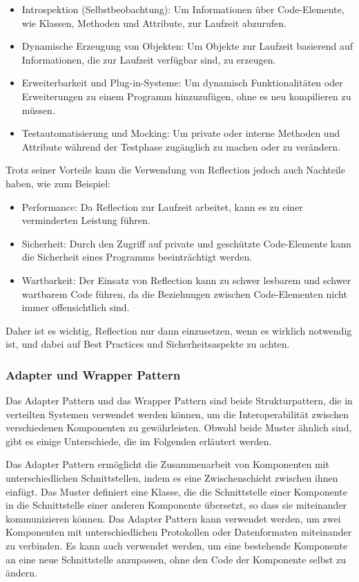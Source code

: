 \begin{itemize}
\item Introspektion (Selbstbeobachtung): Um Informationen über Code-Elemente, wie Klassen, Methoden und Attribute, zur Laufzeit abzurufen.
\item Dynamische Erzeugung von Objekten: Um Objekte zur Laufzeit basierend auf Informationen, die zur Laufzeit verfügbar sind, zu erzeugen.
\item Erweiterbarkeit und Plug-in-Systeme: Um dynamisch Funktionalitäten oder Erweiterungen zu einem Programm hinzuzufügen, ohne es neu kompilieren zu müssen.
\item Testautomatisierung und Mocking: Um private oder interne Methoden und Attribute während der Testphase zugänglich zu machen oder zu verändern.
\end{itemize}    
Trotz seiner Vorteile kann die Verwendung von Reflection jedoch auch Nachteile haben, wie zum Beispiel:
\begin{itemize}
\item Performance: Da Reflection zur Laufzeit arbeitet, kann es zu einer verminderten Leistung führen.
\item Sicherheit: Durch den Zugriff auf private und geschützte Code-Elemente kann die Sicherheit eines Programms beeinträchtigt werden.
\item Wartbarkeit: Der Einsatz von Reflection kann zu schwer lesbarem und schwer wartbarem Code führen, da die Beziehungen zwischen Code-Elementen nicht immer offensichtlich sind.
\end{itemize}   
Daher ist es wichtig, Reflection nur dann einzusetzen, wenn es wirklich notwendig ist, und dabei auf Best Practices und Sicherheitsaspekte zu achten.

\subsubsection{Adapter und Wrapper Pattern}

Das Adapter Pattern und das Wrapper Pattern sind beide Strukturpattern, die in verteilten Systemen verwendet werden können, um die Interoperabilität zwischen verschiedenen Komponenten zu gewährleisten. Obwohl beide Muster ähnlich sind, gibt es einige Unterschiede, die im Folgenden erläutert werden.

Das Adapter Pattern ermöglicht die Zusammenarbeit von Komponenten mit unterschiedlichen Schnittstellen, indem es eine Zwischenschicht zwischen ihnen einfügt. Das Muster definiert eine Klasse, die die Schnittstelle einer Komponente in die Schnittstelle einer anderen Komponente übersetzt, so dass sie miteinander kommunizieren können. Das Adapter Pattern kann verwendet werden, um zwei Komponenten mit unterschiedlichen Protokollen oder Datenformaten miteinander zu verbinden. Es kann auch verwendet werden, um eine bestehende Komponente an eine neue Schnittstelle anzupassen, ohne den Code der Komponente selbst zu ändern.

